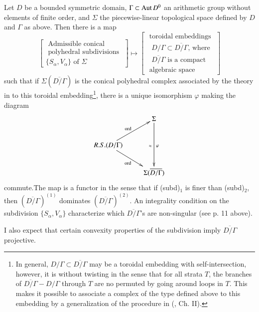 \begin{maintheorem*}[(?)~]
Let $D$ be a bounded symmetric domain, $\Gamma \subset \operatorname{Aut} D^0$ an arithmetic group without elements of finite order, and $\Sigma$ the piecewise-linear topological space defined by $D$ and $\Gamma$ as above. Then there is a map
$$
\begin{bmatrix}
\text{ Admissible conical }\\
\text{ polyhedral subdivisions }\\
\{S_\alpha, V_\alpha\} \text{ of } \Sigma
\end{bmatrix} 
\longmapsto
\begin{bmatrix}
\text{ toroidal embeddings }\\
\text{ $D/ \Gamma \subset \overline{D/ \Gamma}$, where }\\
\text{ $\overline{D/ \Gamma}$ is a compact }\\
\text{ algebraic space }
\end{bmatrix}
$$
such that if $\Sigma (\overline{D/\Gamma})$ is the conical polyhedral complex associated by the theory in \cite{art8-key8} to this toroidal embedding\footnote{In general, $D/\Gamma \subset \overline{D/\Gamma}$ may be a toroidal embedding with self-intersection, however, it is without twisting in the sense that for all strata $T$, the branches of $\overline{D/\Gamma}-D/\Gamma$ through $T$ are no permuted by going around loops in $T$. This makes it possible to associate a complex of the type defined above to this embedding by a generalization of the procedure in (\cite{art8-key8}, Ch. II).}, there is a unique isomorphism $\varphi$ making the diagram
$$
\xymatrix{
& \Sigma\ar[dd]^\varphi_{\approx}\\
R. S. (D/ \Gamma) \ar[ur]^{\text{ord}}\ar[dr]_{\text{ord}}& \\
& \Sigma (\overline{D/\Gamma})
}
$$
commute.\pageoriginale The map is a functor in the sense that if (subd)$_1$ is finer than (subd)$_2$, then $(\overline{D/\Gamma})^{(1)}$ dominates $(\overline{D/\Gamma})^{(2)}$. An integrality condition on the subdivision $\{S_\alpha, V_\alpha\}$ characterize which $\overline{D/\Gamma}$'s are non-singular (see p. 11 above).
\end{maintheorem*}

I also expect that certain convexity properties of the subdivision imply $\overline{D/\Gamma}$ projective.

